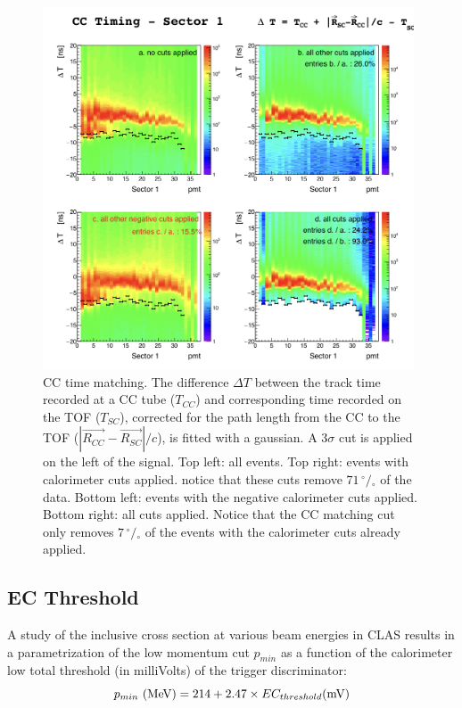 \begin{figure}[ht]
  \centering
		\includegraphics[width=0.98\textwidth]{img/cut-03cctimd_sector-1.png}
		\caption{CC time matching. The difference $\Delta T$ between the track time recorded
               at a CC tube ($T_{CC}$) and corresponding time recorded on the TOF ($T_{SC}$),
               corrected for the path length from the CC to the TOF ($|\vec{R_{CC}}-\vec{R_{SC}}|/c$),
               is fitted with a gaussian. A 3$\sigma$ cut is applied on the left of the signal.
               Top left: all events. Top right: events with calorimeter cuts applied.
               notice that these cuts remove $71 \,^{\circ\!\!}/\!_\circ$ of the data.
               Bottom left: events with the negative calorimeter cuts applied.
               Bottom right: all cuts applied. Notice that the CC matching cut
               only removes $7  \,^{\circ\!\!}/\!_\circ$ of the events with
               the calorimeter cuts already applied.}
 		\label{fig:cc_time_sec1}
\end{figure}

\clearpage\newpage
\subsection{EC Threshold}
A study \cite{bib:ecmin} of the inclusive cross section at various beam energies in CLAS 
results in a parametrization of the low momentum cut $p_{min}$ as a function of
the calorimeter low total threshold (in milliVolts) of the trigger discriminator:
\begin{equation}
 \label{eq:pmin} 
 p_{min}\,\,{\rm (MeV)} = 214 + 2.47\times EC_{threshold}{\rm (mV)}
\end{equation}

